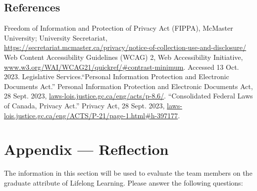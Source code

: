 \documentclass[12pt]{article}
\begin{document}
\subsection{References}
\begin{thebibliography}{9}
   Freedom of Information and Protection of Privacy Act (FIPPA), McMaster University; University Secretariat, \url{https://secretariat.mcmaster.ca/privacy/notice-of-collection-use-and-disclosure/}
   Web Content Accessibility Guidelines (WCAG) 2, Web Accessibility Initiative, \url{www.w3.org/WAI/WCAG21/quickref/#contrast-minimum}. Accessed 13 Oct. 2023. 
   Legislative Services.``Personal Information Protection and Electronic Documents Act.'' Personal Information Protection and Electronic Documents Act, 28 Sept. 2023, \url{laws-lois.justice.gc.ca/eng/acts/p-8.6/}. 
   ``Consolidated Federal Laws of Canada, Privacy Act.'' Privacy Act, 28 Sept. 2023, \url{laws-lois.justice.gc.ca/eng/ACTS/P-21/page-1.html#h-397177}. 
\end{thebibliography}

\newpage{}
\section*{Appendix --- Reflection}

The information in this section will be used to evaluate the team members on the
graduate attribute of Lifelong Learning.  Please answer the following questions:
\end{document}
